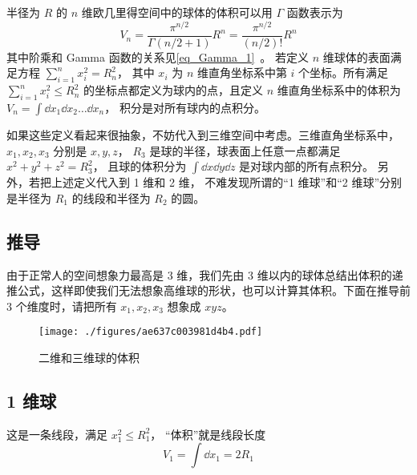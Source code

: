 
半径为 $R$ 的 $n$ 维欧几里得空间中的球体的体积可以用 $\Gamma$ 函数表示为
\begin{equation}\label{eq_NSphV_8}
V_n = \frac{\pi^{n/2}}{\Gamma (n/2+1)} R^n = \frac{\pi^{n/2}}{(n/2)!} R^n
\end{equation}
其中阶乘和 Gamma 函数的关系见\autoref{eq_Gamma_1}~。 若定义 $n$ 维球体的表面满足方程 $\sum_{i=1}^n x_i^2 = R_n^2$， 其中 $x_i$ 为 $n$ 维直角坐标系中第 $i$ 个坐标。所有满足 $\sum_{i=1}^n x_i^2 \leqslant R_n^2$ 的坐标点都定义为球内的点，且定义 $n$ 维直角坐标系中的体积为 $V_n = \int \dd{x_1}\dd{x_2}\dots\dd{x_n}$， 积分是对所有球内的点积分。

如果这些定义看起来很抽象，不妨代入到三维空间中考虑。三维直角坐标系中， $x_1, x_2, x_3$ 分别是 $x,y,z$，  $R_3$ 是球的半径，球表面上任意一点都满足 $x^2 + y^2 + z^2 = R_3^2$， 且球的体积分为 $\int \dd{x}\dd{y}\dd{z}$ 是对球内部的所有点积分。 另外，若把上述定义代入到 1 维和 2 维， 不难发现所谓的“1 维球”和“2 维球”分别是半径为 $R_1$ 的线段和半径为 $R_2$ 的圆。

\subsection{推导}
由于正常人的空间想象力最高是 3 维，我们先由 3 维以内的球体总结出体积的递推公式，这样即使我们无法想象高维球的形状，也可以计算其体积。下面在推导前 3 个维度时，请把所有 $x_1, x_2, x_3$ 想象成 $xyz$。 
\begin{figure}[ht]
\centering
\texttt{[image: ./figures/ae637c003981d4b4.pdf]}
\caption{二维和三维球的体积} \label{fig_NSphV_1}
\end{figure}
\subsection{1 维球}
这是一条线段，满足 $x_1^2 \leqslant R_1^2$， “体积”就是线段长度
\begin{equation}\label{eq_NSphV_1}
V_1 = \int \dd{x_1} = 2 R_1
\end{equation}
